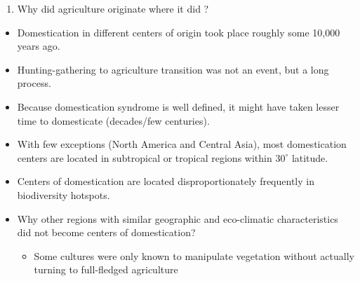 \documentclass[
  ignorenonframetext,
  aspectratio=169]{beamer}
\providecommand{\tightlist}{%
  \setlength{\itemsep}{0pt}\setlength{\parskip}{0pt}}
\begin{document}
\begin{frame}{}
\protect\hypertarget{section-2}{}
\footnotesize

\begin{enumerate}[<+->]
\tightlist
\item
  \alert{Why did agriculture originate where it did ?}
\end{enumerate}

\begin{itemize}[<+->]
\tightlist
\item
  Domestication in different centers of origin took place roughly some
  10,000 years ago.
\item
  Hunting-gathering to agriculture transition was not an event, but a
  long process.
\item
  Because domestication syndrome is well defined, it might have taken
  lesser time to domesticate (decades/few centuries).
\item
  With few exceptions (North America and Central Asia), most
  domestication centers are located in subtropical or tropical regions
  within \(30^\circ\) latitude.
\item
  Centers of domestication are located disproportionately frequently in
  biodiversity hotspots.
\item
  Why other regions with similar geographic and eco-climatic
  characteristics did not become centers of domestication?

  \begin{itemize}[<+->]
  \tightlist
  \item
    Some cultures were only known to manipulate vegetation without
    actually turning to full-fledged agriculture
  \end{itemize}
\end{itemize}
\end{frame}
\end{document}
